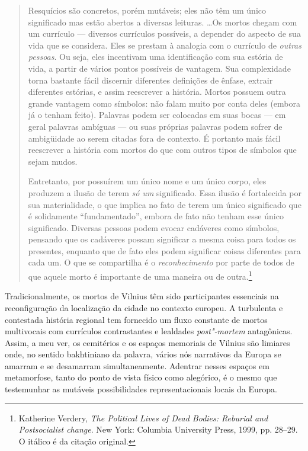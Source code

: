 \begin{quote}
Resquícios são concretos, porém mutáveis; eles não têm um único
significado mas estão abertos a diversas leituras. \ldots{}Os mortos chegam
com um currículo --- diversos currículos possíveis, a depender do aspecto
de sua vida que se considera. Eles se prestam à analogia com o currículo
de \emph{outras pessoas}. Ou seja, eles incentivam uma identificação com
sua estória de vida, a partir de vários pontos possíveis de vantagem.
Sua complexidade torna bastante fácil discernir diferentes definições de
ênfase, extrair diferentes estórias, e assim reescrever a história.
Mortos possuem outra grande vantagem como símbolos: não falam muito por
conta deles (embora já o tenham feito). Palavras podem ser colocadas em
suas bocas --- em geral palavras ambíguas --- ou suas próprias palavras
podem sofrer de ambigüidade ao serem citadas fora de contexto. É
portanto mais fácil reescrever a história com mortos do que com outros
tipos de símbolos que sejam mudos.

Entretanto, por possuírem um único nome e um único corpo, eles produzem
a ilusão de terem \emph{só um} significado. Essa ilusão é fortalecida
por sua materialidade, o que implica no fato de terem um único
significado que é solidamente ``fundamentado'', embora de fato não
tenham esse único significado. Diversas pessoas podem evocar cadáveres
como símbolos, pensando que os cadáveres possam significar a mesma coisa
para todos os presentes, enquanto que de fato eles podem significar
coisas diferentes para cada um. O que se compartilha é o
\emph{reconhecimento} por parte de todos de que aquele morto é
importante de uma maneira ou de outra.\footnote{Katherine Verdery,
  \emph{The Political Lives of Dead Bodies: Reburial and Postsocialist
  change}. New York: Columbia University Press, 1999, pp. 28--29. O
  itálico é da citação original.}
\end{quote}

Tradicionalmente, os mortos de Vilnius têm sido participantes essenciais
na reconfiguração da localização da cidade no contexto europeu. A
turbulenta e contestada história regional tem fornecido um fluxo
constante de mortos multivocais com currículos contrastantes e lealdades
\emph{post"-mortem} antagônicas. Assim, a meu ver, os cemitérios e os
espaços memoriais de Vilnius são limiares onde, no sentido bakhtiniano
da palavra, vários nós narrativos da Europa se amarram e se desamarram
simultaneamente. Adentrar nesses espaços em metamorfose, tanto do ponto
de vista físico como alegórico, é o mesmo que testemunhar as mutáveis
possibilidades representacionais locais da Europa.

